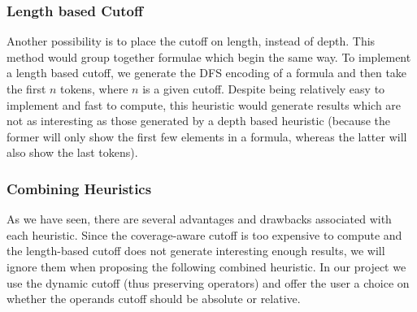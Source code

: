 \documentclass[a4paper,oneside]{article}
\begin{document}
\subsubsection{Length based Cutoff}\label{subsubsec:length_based_cutoff}
Another possibility is to place the cutoff on length, instead of depth. This
method would group together formulae which begin the same way. To implement
a length based cutoff, we generate the DFS encoding of a formula and then take
the first $n$ tokens, where $n$ is a given cutoff. Despite being relatively
easy to implement and fast to compute, this heuristic would generate results
which are not as interesting as those generated by a depth based heuristic
(because the former will only show the first few elements in a formula, whereas
the latter will also show the last tokens).

\subsubsection{Combining Heuristics}\label{subsubsec:combining_cutoffs}
As we have seen, there are several advantages and drawbacks associated with
each heuristic. Since the coverage-aware cutoff is too expensive to compute and
the length-based cutoff does not generate interesting enough results, we
will ignore them when proposing the following combined heuristic. In our
project we use the dynamic cutoff (thus preserving operators) and offer the
user a choice on whether the operands cutoff should be absolute or relative.
\end{document}
